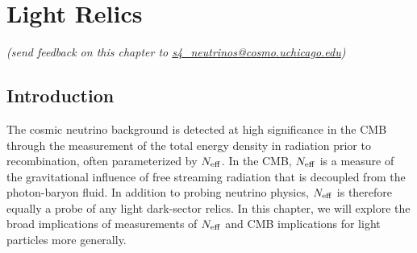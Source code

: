  
\chapter{Light Relics}


\def\beq{\begin{equation}}
\def\eeq{\end{equation}}

\def\bea{\begin{eqnarray}}
\def\eea{\end{eqnarray}}

\def\Neff{N_{\rm eff}}
\def\Nf{N_{\rm eff}}
\def\gs{g_{\star}}
\def\Mpl{M_{\rm P}}


\def\lsim{\raise-.75ex\hbox{$\buildrel<\over\sim$}}

\begin{center}
{\small \it (send feedback on this chapter to \href{mailto:s4_neutrinos@cosmo.uchicago.edu}{s4\_neutrinos@cosmo.uchicago.edu})}
\end{center}

\begin{quotation}


  
\end{quotation}
    
\section{Introduction}



The cosmic neutrino background is detected at high significance in the CMB through the measurement of the total energy density in radiation prior to recombination, often parameterized by $\Neff$.  In the CMB, $\Neff$ is a measure of the gravitational influence of free streaming radiation that is decoupled from the photon-baryon fluid.  In addition to probing neutrino physics, $\Neff$ is therefore equally a probe of any light dark-sector relics.  In this chapter, we will explore the broad implications of measurements of $\Neff$ and CMB implications for light particles more generally.

